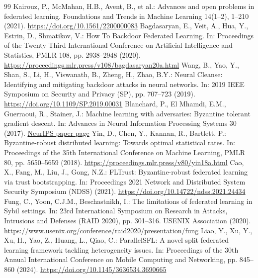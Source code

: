\documentclass[runningheads,orivec]{llncs}
\begin{document}
\begingroup
\small
\begin{thebibliography}{99}
\setlength{\itemsep}{0pt}
     Kairouz, P., McMahan, H.B., Avent, B., et al.: Advances and open problems in federated learning. Foundations and Trends in Machine Learning 14(1--2), 1--210 (2021). \url{https://doi.org/10.1561/2200000083}
     Bagdasaryan, E., Veit, A., Hua, Y., Estrin, D., Shmatikov, V.: How To Backdoor Federated Learning. In: Proceedings of the Twenty Third International Conference on Artificial Intelligence and Statistics, PMLR 108, pp. 2938--2948 (2020). \url{https://proceedings.mlr.press/v108/bagdasaryan20a.html}
     Wang, B., Yao, Y., Shan, S., Li, H., Viswanath, B., Zheng, H., Zhao, B.Y.: Neural Cleanse: Identifying and mitigating backdoor attacks in neural networks. In: 2019 IEEE Symposium on Security and Privacy (SP), pp. 707--723 (2019). \url{https://doi.org/10.1109/SP.2019.00031}
     Blanchard, P., El Mhamdi, E.M., Guerraoui, R., Stainer, J.: Machine learning with adversaries: Byzantine tolerant gradient descent. In: Advances in Neural Information Processing Systems 30 (2017). \href{https://papers.nips.cc/paper/6617-machine-learning-with-adversaries-byzantine-tolerant-gradient-descent}{NeurIPS paper page}
     Yin, D., Chen, Y., Kannan, R., Bartlett, P.: Byzantine-robust distributed learning: Towards optimal statistical rates. In: Proceedings of the 35th International Conference on Machine Learning, PMLR 80, pp. 5650--5659 (2018). \url{https://proceedings.mlr.press/v80/yin18a.html}
     Cao, X., Fang, M., Liu, J., Gong, N.Z.: FLTrust: Byzantine-robust federated learning via trust bootstrapping. In: Proceedings 2021 Network and Distributed System Security Symposium (NDSS) (2021). \url{https://doi.org/10.14722/ndss.2021.24434}
     Fung, C., Yoon, C.J.M., Beschastnikh, I.: The limitations of federated learning in Sybil settings. In: 23rd International Symposium on Research in Attacks, Intrusions and Defenses (RAID 2020), pp. 301--316. USENIX Association (2020). \url{https://www.usenix.org/conference/raid2020/presentation/fung}
     Liao, Y., Xu, Y., Xu, H., Yao, Z., Huang, L., Qiao, C.: ParallelSFL: A novel split federated learning framework tackling heterogeneity issues. In: Proceedings of the 30th Annual International Conference on Mobile Computing and Networking, pp. 845--860 (2024). \url{https://doi.org/10.1145/3636534.3690665}

\end{thebibliography}
\end{document}
